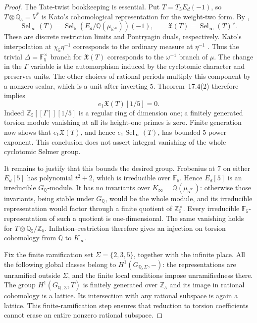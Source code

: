 \begin{proof}
The Tate-twist bookkeeping is essential. Put
$T=T_5E_d(-1)$, so $T\otimes\mathbb Q_5=V^*$ is Kato's
cohomological representation for the weight-two form. By
\citet[Proposition~17.2 and \S17.3]{FA_Kato2004},
\[
 \operatorname{Sel}_\infty(T)
   =\operatorname{Sel}_5(E_d/\mathbb Q(\mu_{5^\infty}))(-1),
 \qquad
 \mathfrak X(T)=\operatorname{Sel}_\infty(T)^\vee.
\]
These are discrete restriction limits and Pontryagin duals,
respectively. Kato's interpolation at $\chi_5\eta^{-1}$
corresponds to the ordinary measure at $\eta^{-1}$
\citep[Theorem~16.2, with $r=1$]{FA_Kato2004}.
Thus the trivial $\Delta=\mathbb F_5^\times$ branch for
$\mathfrak X(T)$ corresponds to the $\omega^{-1}$ branch of
$\mu$. The change in the $\Gamma$ variable is the automorphism
induced by the cyclotomic character and preserves units.
The other choices of rational periods multiply this component
by a nonzero scalar, which is a unit after inverting $5$.
Theorem~17.4(2) therefore implies
\[
 e_1\mathfrak X(T)[1/5]=0.
\]
Indeed $\mathbb Z_5[[\Gamma]][1/5]$ is a regular ring of dimension
one; a finitely generated torsion module vanishing at all its
height-one primes is zero. Finite generation now shows that
$e_1\mathfrak X(T)$, and hence $e_1\operatorname{Sel}_\infty(T)$,
has bounded $5$-power exponent. This conclusion does not assert
integral vanishing of the whole cyclotomic Selmer group.

It remains to justify that this bounds the desired group.
Frobenius at $7$ on either $E_d[5]$ has polynomial $t^2+2$, which is
irreducible over $\mathbb F_5$. Hence $E_d[5]$ is an irreducible
$G_{\mathbb Q}$-module. It has no invariants over
$K_\infty=\mathbb Q(\mu_{5^\infty})$: otherwise those invariants,
being stable under $G_{\mathbb Q}$, would be the whole module,
and its irreducible representation would factor through a finite
quotient of $\mathbb Z_5^\times$. Every irreducible
$\mathbb F_5$-representation of such a quotient is one-dimensional.
The same vanishing holds for $T\otimes\mathbb Q_5/\mathbb Z_5$.
Inflation--restriction therefore gives an injection on torsion
cohomology from $\mathbb Q$ to $K_\infty$.

Fix the finite ramification set $\Sigma=\{2,3,5\}$, together with
the infinite place. All the following global classes belong to
$H^1(G_{\mathbb Q,\Sigma},-)$: the representations are unramified
outside $\Sigma$, and the finite local conditions impose
unramifiedness there. The group
$H^1(G_{\mathbb Q,\Sigma},T)$ is finitely generated over
$\mathbb Z_5$ and its image in rational cohomology is a lattice.
Its intersection with any rational subspace is again a lattice.
This finite-ramification step ensures that reduction to torsion
coefficients cannot erase an entire nonzero rational subspace.


\end{proof}
